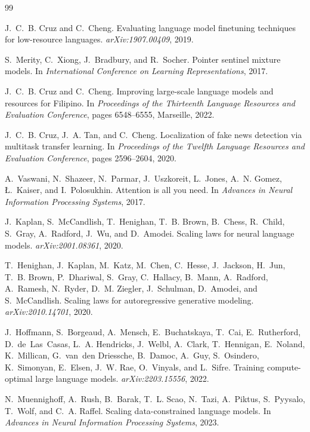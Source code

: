 \documentclass[11pt,a4paper]{article}
\begin{document}
\begin{thebibliography}{99}

J.~C.~B. Cruz and C.~Cheng.
\newblock Evaluating language model finetuning techniques for low-resource languages.
\newblock \emph{arXiv:1907.00409}, 2019.

S.~Merity, C.~Xiong, J.~Bradbury, and R.~Socher.
\newblock Pointer sentinel mixture models.
\newblock In \emph{International Conference on Learning Representations}, 2017.

J.~C.~B. Cruz and C.~Cheng.
\newblock Improving large-scale language models and resources for Filipino.
\newblock In \emph{Proceedings of the Thirteenth Language Resources and Evaluation Conference}, pages 6548--6555, Marseille, 2022.

J.~C.~B. Cruz, J.~A. Tan, and C.~Cheng.
\newblock Localization of fake news detection via multitask transfer learning.
\newblock In \emph{Proceedings of the Twelfth Language Resources and Evaluation Conference}, pages 2596--2604, 2020.

A.~Vaswani, N.~Shazeer, N.~Parmar, J.~Uszkoreit, L.~Jones, A.~N. Gomez, {\L}.~Kaiser, and I.~Polosukhin.
\newblock Attention is all you need.
\newblock In \emph{Advances in Neural Information Processing Systems}, 2017.

J.~Kaplan, S.~McCandlish, T.~Henighan, T.~B. Brown, B.~Chess, R.~Child, S.~Gray, A.~Radford, J.~Wu, and D.~Amodei.
\newblock Scaling laws for neural language models.
\newblock \emph{arXiv:2001.08361}, 2020.

T.~Henighan, J.~Kaplan, M.~Katz, M.~Chen, C.~Hesse, J.~Jackson, H.~Jun, T.~B. Brown, P.~Dhariwal, S.~Gray, C.~Hallacy, B.~Mann, A.~Radford, A.~Ramesh, N.~Ryder, D.~M. Ziegler, J.~Schulman, D.~Amodei, and S.~McCandlish.
\newblock Scaling laws for autoregressive generative modeling.
\newblock \emph{arXiv:2010.14701}, 2020.

J.~Hoffmann, S.~Borgeaud, A.~Mensch, E.~Buchatskaya, T.~Cai, E.~Rutherford, D.~de~Las~Casas, L.~A. Hendricks, J.~Welbl, A.~Clark, T.~Hennigan, E.~Noland, K.~Millican, G.~van~den Driessche, B.~Damoc, A.~Guy, S.~Osindero, K.~Simonyan, E.~Elsen, J.~W. Rae, O.~Vinyals, and L.~Sifre.
\newblock Training compute-optimal large language models.
\newblock \emph{arXiv:2203.15556}, 2022.

N.~Muennighoff, A.~Rush, B.~Barak, T.~L. Scao, N.~Tazi, A.~Piktus, S.~Pyysalo, T.~Wolf, and C.~A. Raffel.
\newblock Scaling data-constrained language models.
\newblock In \emph{Advances in Neural Information Processing Systems}, 2023.


\end{thebibliography}
\end{document}
